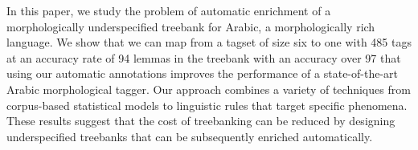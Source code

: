 In this paper, we study the problem of automatic enrichment of a morphologically underspecified treebank for Arabic, a morphologically rich
 language. We show that we can map from a tagset of size six to one with 485
 tags at an accuracy rate of 94%
 lemmas in the treebank with an accuracy over 97%
 that using our automatic annotations improves the performance of a
 state-of-the-art Arabic morphological tagger.  Our approach combines a variety
 of techniques from corpus-based statistical models to linguistic rules that
 target specific phenomena.  These results suggest that the cost of treebanking
 can be reduced by designing underspecified treebanks that can be subsequently
 enriched automatically.

